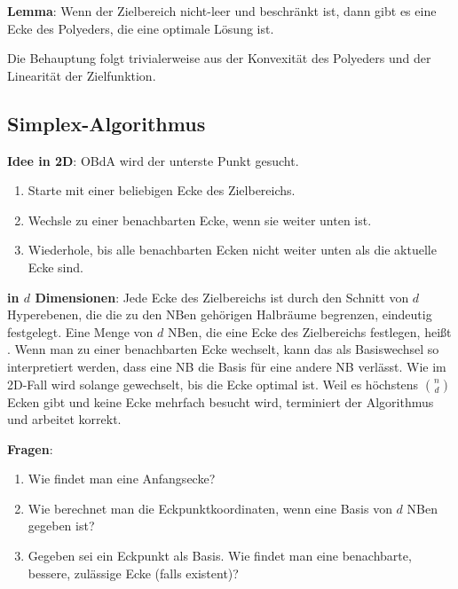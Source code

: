 \linie

\textbf{Lemma}:
Wenn der Zielbereich nicht-leer und beschränkt ist,
dann gibt es eine Ecke des Polyeders, die eine optimale Lösung ist.

\begin{Beweis}
    Die Behauptung folgt trivialerweise aus der Konvexität des Polyeders und der
    Linearität der Zielfunktion.
\end{Beweis}

\subsection{%
    Simplex-Algorithmus%
}

\textbf{Idee in 2D}:
OBdA wird der unterste Punkt gesucht.
\begin{enumerate}
    \item
    Starte mit einer beliebigen Ecke des Zielbereichs.

    \item
    Wechsle zu einer benachbarten Ecke, wenn sie weiter unten ist.

    \item
    Wiederhole, bis alle benachbarten Ecken nicht weiter unten als die aktuelle Ecke sind.
\end{enumerate}

\linie

\textbf{in $d$ Dimensionen}:
Jede Ecke des Zielbereichs ist durch den Schnitt von $d$ Hyperebenen,
die die zu den NBen gehörigen Halbräume begrenzen, eindeutig festgelegt.
Eine Menge von $d$ NBen, die eine Ecke des Zielbereichs festlegen, heißt .
Wenn man zu einer benachbarten Ecke wechselt, kann das als Basiswechsel so interpretiert werden,
dass eine NB die Basis für eine andere NB verlässt.
Wie im 2D-Fall wird solange gewechselt, bis die Ecke optimal ist.
Weil es höchstens $\binom{n}{d}$ Ecken gibt und keine Ecke mehrfach besucht wird,
terminiert der Algorithmus und arbeitet korrekt.

\linie
\pagebreak

\textbf{Fragen}:
\begin{enumerate}
    \item
    Wie findet man eine Anfangsecke?

    \item
    Wie berechnet man die Eckpunktkoordinaten, wenn eine Basis von $d$ NBen gegeben ist?

    \item
    Gegeben sei ein Eckpunkt als Basis.
    Wie findet man eine benachbarte, bessere, zulässige Ecke (falls existent)?
\end{enumerate}

